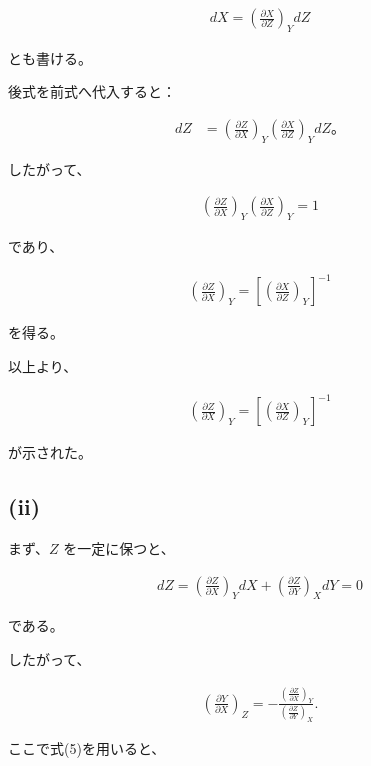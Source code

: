 \documentclass[platex,dvipdfmx,a4paper]{jsarticle}
\begin{document}
\begin{align*}
dX
=
\left(\frac{\partial X}{\partial Z}\right)_Y dZ
\end{align*}

とも書ける。

後式を前式へ代入すると：

\begin{align*}
dZ
&=
\left(\frac{\partial Z}{\partial X}\right)_Y
\left(\frac{\partial X}{\partial Z}\right)_Y
dZ。
\end{align*}

したがって、

\begin{align*}
\left(\frac{\partial Z}{\partial X}\right)_Y
\left(\frac{\partial X}{\partial Z}\right)_Y
=
1
\end{align*}

であり、

\begin{align*}
\left(\frac{\partial Z}{\partial X}\right)_Y
=
\left[
\left(\frac{\partial X}{\partial Z}\right)_Y
\right]^{-1}
\end{align*}

を得る。

以上より、

\begin{align*}
\boxed{
\left(\frac{\partial Z}{\partial X}\right)_Y
=
\left[
\left(\frac{\partial X}{\partial Z}\right)_Y
\right]^{-1}
}
\end{align*}

が示された。

\subsection{(ii)}

まず、$Z$ を一定に保つと、

\begin{align*}
dZ
=
\left(\frac{\partial Z}{\partial X}\right)_Y dX
+
\left(\frac{\partial Z}{\partial Y}\right)_X dY
=
0
\end{align*}

である。

したがって、

\begin{align*}
\left(\frac{\partial Y}{\partial X}\right)_Z
=
-
\frac{
\left(\frac{\partial Z}{\partial X}\right)_Y
}{
\left(\frac{\partial Z}{\partial Y}\right)_X
}.
\end{align*}

ここで式(5)を用いると、
\end{document}
